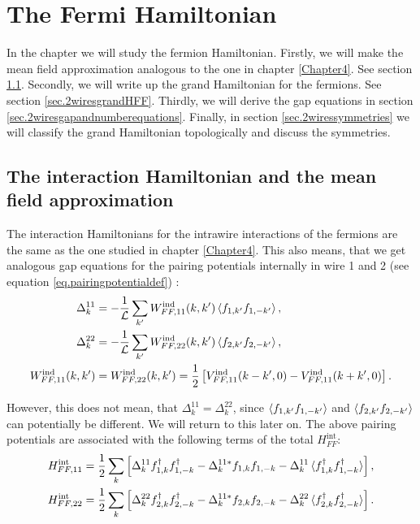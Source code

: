 
\chapter{The Fermi Hamiltonian} %

\label{Chapter9} %


In the chapter we will study the fermion Hamiltonian. Firstly, we will make the mean field approximation analogous to the one in chapter \ref{Chapter4}. See section \ref{sec.2wiresmeanfieldapproximation}. Secondly, we will write up the grand Hamiltonian for the fermions. See section \ref{sec.2wiresgrandHFF}. Thirdly, we will derive the gap equations in section \ref{sec.2wiresgapandnumberequations}. Finally, in section \ref{sec.2wiressymmetries} we will classify the grand Hamiltonian topologically and discuss the symmetries. 

\section{The interaction Hamiltonian and the mean field approximation}
\label{sec.2wiresmeanfieldapproximation}
The interaction Hamiltonians for the intrawire interactions of the fermions are the same as the one studied in chapter \ref{Chapter4}. This also means, that we get analogous gap equations for the pairing potentials internally in wire 1 and 2 (see equation \ref{eq.pairingpotentialdef}) :
\begin{align}
\Delta^{11}_k &= -\frac{1}{\mathcal{L}} \sum_{k'} W^\text{ind}_{FF,11}(k,k')\braket{f_{1,k'}f_{1,-k'}}, \nonumber \\
\Delta^{22}_k &= -\frac{1}{\mathcal{L}} \sum_{k'} W^\text{ind}_{FF,22}(k,k')\braket{f_{2,k'}f_{2,-k'}}, \nonumber \\
W^\text{ind}_{FF,11}(k,k') &= W^\text{ind}_{FF,22}(k,k') = \frac{1}{2}\left[V^\text{ind}_{FF,11}(k-k',0) - V^\text{ind}_{FF,11}(k+k',0) \right].
\label{eq.pairingpotentialsintrawire}
\end{align}

However, this does not mean, that $\Delta^{11}_k = \Delta^{22}_k$, since $\braket{f_{1,k'}f_{1,-k'}}$ and $\braket{f_{2,k'}f_{2,-k'}}$ can potentially be different. We will return to this later on. The above pairing potentials are associated with the following terms of the total $H^\text{int}_{FF}$:
\begin{align}
H^\text{int}_{FF,11} &= \frac{1}{2}\sum_k \left[\Delta^{11}_k f^\dagger_{1,k}f^\dagger_{1,-k} - \Delta^{11 *}_k f_{1,k}f_{1,-k} - \Delta^{11}_k\braket{f^\dagger_{1,k}f^\dagger_{1,-k}} \right], \nonumber \\
H^\text{int}_{FF,22} &= \frac{1}{2}\sum_k \left[\Delta^{22}_k f^\dagger_{2,k}f^\dagger_{2,-k} - \Delta^{11 *}_k f_{2,k}f_{2,-k} - \Delta^{22}_k\braket{f^\dagger_{2,k}f^\dagger_{2,-k}} \right].
\label{eq.Hintintrawire}
\end{align}

